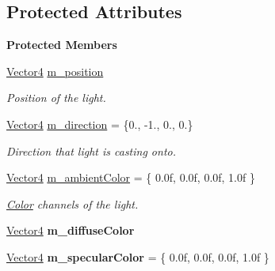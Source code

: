 \subsection*{Protected Attributes}
\begin{Indent}\textbf{ Protected Members}\par
\begin{DoxyCompactItemize}
\item 
\mbox{\label{classrev_1_1_light_a6cc33aa901b6d2665178ee9a6ff7605d}} 
\mbox{\hyperlink{classrev_1_1_vector}{Vector4}} \mbox{\hyperlink{classrev_1_1_light_a6cc33aa901b6d2665178ee9a6ff7605d}{m\+\_\+position}}
\begin{DoxyCompactList}\small\item\em Position of the light. \end{DoxyCompactList}\item 
\mbox{\label{classrev_1_1_light_adb38058e93e9fe8f630feaac7abfd272}} 
\mbox{\hyperlink{classrev_1_1_vector}{Vector4}} \mbox{\hyperlink{classrev_1_1_light_adb38058e93e9fe8f630feaac7abfd272}{m\+\_\+direction}} = \{0., -\/1., 0., 0.\}
\begin{DoxyCompactList}\small\item\em Direction that light is casting onto. \end{DoxyCompactList}\item 
\mbox{\label{classrev_1_1_light_ab5597153317ee40355ab3f6f2db2659c}} 
\mbox{\hyperlink{classrev_1_1_vector}{Vector4}} \mbox{\hyperlink{classrev_1_1_light_ab5597153317ee40355ab3f6f2db2659c}{m\+\_\+ambient\+Color}} = \{ 0.\+0f, 0.\+0f, 0.\+0f, 1.\+0f \}
\begin{DoxyCompactList}\small\item\em \mbox{\hyperlink{classrev_1_1_color}{Color}} channels of the light. \end{DoxyCompactList}\item 
\mbox{\label{classrev_1_1_light_a9c97f6ee43f57a64f59ac32b2e443476}} 
\mbox{\hyperlink{classrev_1_1_vector}{Vector4}} {\bfseries m\+\_\+diffuse\+Color}
\item 
\mbox{\label{classrev_1_1_light_aa20d6eb5eacac2e667cf9b0cadac8218}} 
\mbox{\hyperlink{classrev_1_1_vector}{Vector4}} {\bfseries m\+\_\+specular\+Color} = \{ 0.\+0f, 0.\+0f, 0.\+0f, 1.\+0f \}

\end{DoxyCompactItemize}
\end{Indent}
